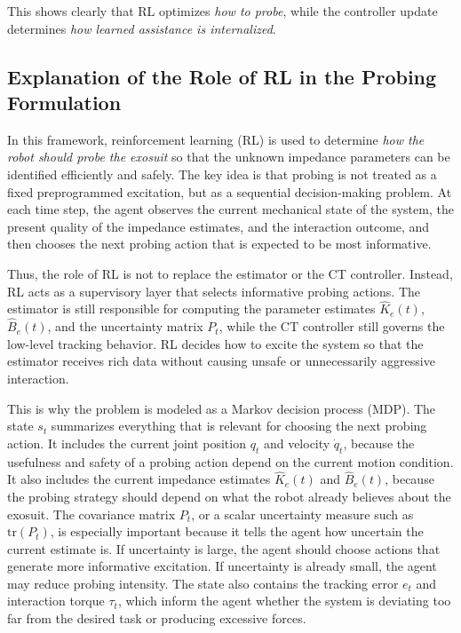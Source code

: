 \documentclass[11pt]{article}
\begin{document}
This shows clearly that RL optimizes \emph{how to probe}, while the controller update determines \emph{how learned assistance is internalized}.

\subsection{Explanation of the Role of RL in the Probing Formulation}

In this framework, reinforcement learning (RL) is used to determine \emph{how the robot should probe the exosuit} so that the unknown impedance parameters can be identified efficiently and safely. The key idea is that probing is not treated as a fixed preprogrammed excitation, but as a sequential decision-making problem. At each time step, the agent observes the current mechanical state of the system, the present quality of the impedance estimates, and the interaction outcome, and then chooses the next probing action that is expected to be most informative.

Thus, the role of RL is not to replace the estimator or the CT controller. Instead, RL acts as a supervisory layer that selects informative probing actions. The estimator is still responsible for computing the parameter estimates \(\hat{K}_e(t)\), \(\hat{B}_e(t)\), and the uncertainty matrix \(P_t\), while the CT controller still governs the low-level tracking behavior. RL decides how to excite the system so that the estimator receives rich data without causing unsafe or unnecessarily aggressive interaction.

This is why the problem is modeled as a Markov decision process (MDP). The state \(s_t\) summarizes everything that is relevant for choosing the next probing action. It includes the current joint position \(q_t\) and velocity \(\dot q_t\), because the usefulness and safety of a probing action depend on the current motion condition. It also includes the current impedance estimates \(\hat K_e(t)\) and \(\hat B_e(t)\), because the probing strategy should depend on what the robot already believes about the exosuit. The covariance matrix \(P_t\), or a scalar uncertainty measure such as \(\mathrm{tr}(P_t)\), is especially important because it tells the agent how uncertain the current estimate is. If uncertainty is large, the agent should choose actions that generate more informative excitation. If uncertainty is already small, the agent may reduce probing intensity. The state also contains the tracking error \(e_t\) and interaction torque \(\tau_t\), which inform the agent whether the system is deviating too far from the desired task or producing excessive forces.
\end{document}
